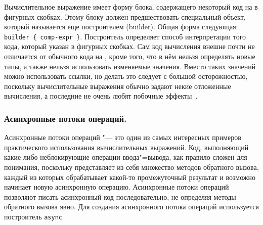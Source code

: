 Вычислительное выражение имеет форму блока, содержащего некоторый код на \fsharp{} в фигурных скобках.
Этому блоку должен предшествовать специальный объект, который называется еще построителем (builder).
Общая форма следующая: \lstinline[style=fsharpstyle]!builder { comp-expr }!.
Построитель определяет способ интерпретации того кода, который указан в фигурных скобках.
Сам код вычисления внешне почти не отличается от обычного кода на \fsharp{}, кроме того, что в нём нельзя определять новые типы, а также нельзя использовать изменяемые значения.
Вместо таких значений можно использовать ссылки, но делать это следует с большой осторожностью, поскольку вычислительные выражения обычно задают некие отложенные вычисления, а последние не очень любят побочные эффекты~\cite{fsharp_pfp_issue_5}.

\subsubsection{Асинхронные потоки операций. }
\label{ssub:tech:fsharp_async}
Асинхронные потоки операций "--- это один из самых интересных примеров практического использования вычислительных выражений.
Код, выполняющий какие-либо неблокирующие операции ввода"=вывода, как правило сложен для понимания, поскольку представляет из себя множество методов обратного вызова, каждый из которых обрабатывает какой-то промежуточный результат и возможно начинает новую асинхронную операцию.
Асинхронные потоки операций позволяют писать асинхронный код последовательно, не определяя методы обратного вызова явно.
Для создания асинхронного потока операций используется построитель \lstinline[style=fsharpstyle]!async!~\cite{fsharp_pfp_issue_5}